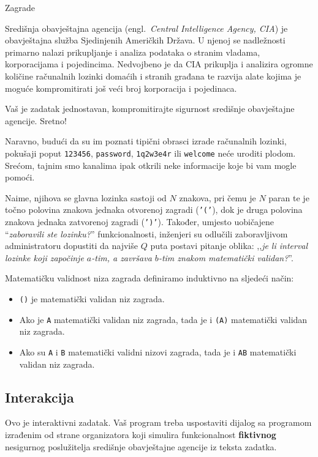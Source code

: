 \begin{statement}[
  problempoints=100,
  timelimit=1 sekunda,
  memorylimit=512 MiB,
]{Zagrade}

Središnja obavještajna agencija (engl.\ \textit{Central Intelligence Agency,
CIA}) je obavještajna služba Sjedinjenih Američkih Država. U njenoj se
nadležnosti primarno nalazi prikupljanje i analiza podataka o stranim
vladama, korporacijama i pojedincima. Nedvojbeno je da CIA prikuplja i analizira
ogromne količine računalnih lozinki domaćih i stranih građana te razvija alate
kojima je moguće kompromitirati još veći broj korporacija i pojedinaca.

Vaš je zadatak jednostavan, kompromitirajte sigurnost središnje obavještajne
agencije. Sretno!

Naravno, budući da su im poznati tipični obrasci izrade računalnih lozinki,
pokušaji poput \texttt{123456}, \texttt{password}, \texttt{1q2w3e4r} ili
\texttt{welcome} neće uroditi plodom. Srećom, tajnim smo kanalima ipak otkrili
neke informacije koje bi vam mogle pomoći.

Naime, njihova se glavna lozinka sastoji od $N$ znakova, pri čemu je $N$ paran
te je točno polovina znakova jednaka otvorenoj zagradi (\texttt{'('}), dok je
druga polovina znakova jednaka zatvorenoj zagradi (\texttt{')'}). Također,
  umjesto uobičajene ``\textit{zaboravili ste lozinku?}'' funkcionalnosti,
inženjeri su odlučili zaboravljivom administratoru dopustiti da
najviše $Q$ puta postavi pitanje oblika: ,,\textit{je li interval lozinke koji
započinje $a$-tim, a završava $b$-tim znakom matematički validan?}''.

Matematičku validnost niza zagrada definiramo induktivno na sljedeći način:

\begin{itemize}
  \item \texttt{()} je matematički validan niz zagrada.
  \item Ako je \texttt{A} matematički validan niz zagrada, tada je i
        \texttt{(A)} matematički validan niz zagrada.
  \item Ako su \texttt{A} i \texttt{B} matematički validni nizovi zagrada,
        tada je i \texttt{AB} matematički validan niz zagrada.
\end{itemize}

\subsection*{Interakcija}
Ovo je interaktivni zadatak. Vaš program treba uspostaviti dijalog sa programom
izrađenim od strane organizatora koji simulira funkcionalnost
\textbf{fiktivnog} nesigurnog poslužitelja središnje obavještajne agencije iz
teksta zadatka.


\end{statement}
